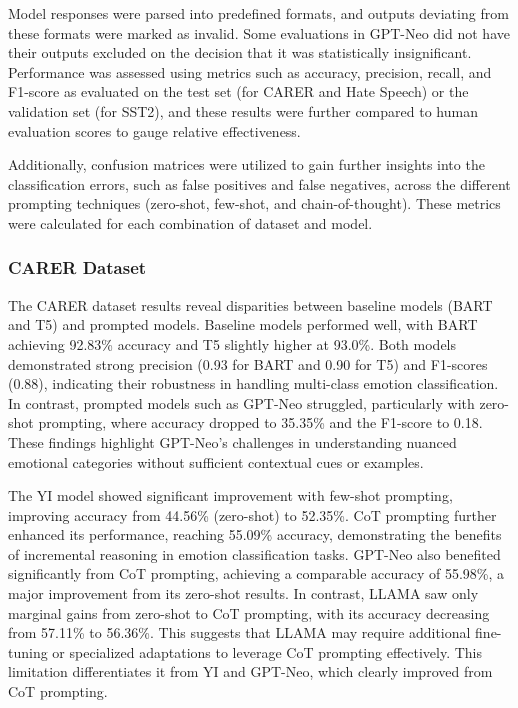 \documentclass[twocolumn]{article}
\begin{document}
Model responses were parsed into predefined formats, and outputs deviating from these formats were marked as invalid. Some evaluations in GPT-Neo did not have their outputs excluded on the decision that it was statistically insignificant. Performance was assessed using metrics such as accuracy, precision, recall, and F1-score as evaluated on the test set (for CARER and Hate Speech) or the validation set (for SST2), and these results were further compared to human evaluation scores to gauge relative effectiveness.

Additionally, confusion matrices were utilized to gain further insights into the classification errors, such as false positives and false negatives, across the different prompting techniques (zero-shot, few-shot, and chain-of-thought). These metrics were calculated for each combination of dataset and model.

\subsubsection{CARER Dataset}

The CARER dataset results reveal disparities between baseline models (BART and T5) and prompted models. Baseline models performed well, with BART achieving 92.83\% accuracy and T5 slightly higher at 93.0\%. Both models demonstrated strong precision (0.93 for BART and 0.90 for T5) and F1-scores (0.88), indicating their robustness in handling multi-class emotion classification. In contrast, prompted models such as GPT-Neo struggled, particularly with zero-shot prompting, where accuracy dropped to 35.35\% and the F1-score to 0.18. These findings highlight GPT-Neo’s challenges in understanding nuanced emotional categories without sufficient contextual cues or examples.

The YI model showed significant improvement with few-shot prompting, improving accuracy from 44.56\% (zero-shot) to 52.35\%. CoT prompting further enhanced its performance, reaching 55.09\% accuracy, demonstrating the benefits of incremental reasoning in emotion classification tasks. GPT-Neo also benefited significantly from CoT prompting, achieving a comparable accuracy of 55.98\%, a major improvement from its zero-shot results. In contrast, LLAMA saw only marginal gains from zero-shot to CoT prompting, with its accuracy decreasing from 57.11\% to 56.36\%. This suggests that LLAMA may require additional fine-tuning or specialized adaptations to leverage CoT prompting effectively. This limitation differentiates it from YI and GPT-Neo, which clearly improved from CoT prompting.
\end{document}
